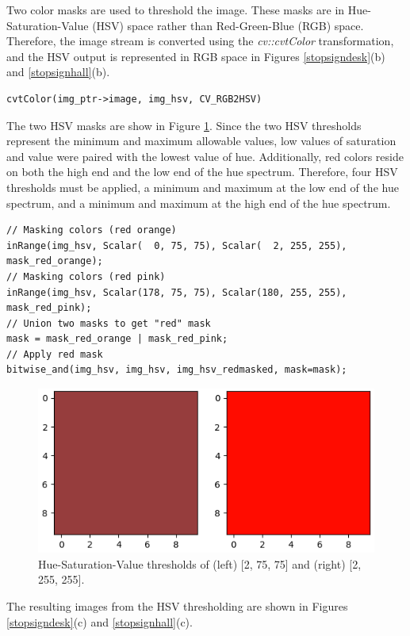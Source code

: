 \documentclass[letterpaper, 10 pt, conference]{ieeeconf}  %
\begin{document}
Two color masks are used to threshold the image. These masks are in Hue-Saturation-Value (HSV) space rather than Red-Green-Blue (RGB) space. Therefore, the image stream is converted using the \textit{cv::cvtColor} transformation, and the HSV output is represented in RGB space in Figures \ref{stopsigndesk}(b) and \ref{stopsignhall}(b).

\begin{lstlisting}
cvtColor(img_ptr->image, img_hsv, CV_RGB2HSV)
\end{lstlisting}

The two HSV masks are show in Figure \ref{stopsign_color_thresholds}. Since the two HSV thresholds represent the minimum and maximum allowable values, low values of saturation and value were paired with the lowest value of hue. Additionally, red colors reside on both the high end and the low end of the hue spectrum. Therefore, four HSV thresholds must be applied, a minimum and maximum at the low end of the hue spectrum, and a minimum and maximum at the high end of the hue spectrum. 

\begin{lstlisting}
// Masking colors (red orange)
inRange(img_hsv, Scalar(  0, 75, 75), Scalar(  2, 255, 255), mask_red_orange);
// Masking colors (red pink)
inRange(img_hsv, Scalar(178, 75, 75), Scalar(180, 255, 255), mask_red_pink);
// Union two masks to get "red" mask
mask = mask_red_orange | mask_red_pink;
// Apply red mask
bitwise_and(img_hsv, img_hsv, img_hsv_redmasked, mask=mask);
\end{lstlisting}

\begin{figure}[tp]
\begin{center}
\includegraphics[width=.48\textwidth]{Figures/stopsign/stopsign_color_thresholds.png}
\caption{Hue-Saturation-Value thresholds of (left) [2, 75, 75] and (right) [2, 255, 255].}
\label{stopsign_color_thresholds}
\end{center}
\end{figure}

The resulting images from the HSV thresholding are shown in Figures \ref{stopsigndesk}(c) and \ref{stopsignhall}(c).
\end{document}
